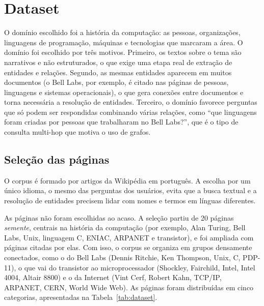 %

\section{Dataset}
\label{sec:dataset}

O domínio escolhido foi a história da computação: as pessoas, organizações, linguagens de programação, máquinas e tecnologias que marcaram a área. O domínio foi escolhido por três motivos. Primeiro, os textos sobre o tema são narrativos e não estruturados, o que exige uma etapa real de extração de entidades e relações. Segundo, as mesmas entidades aparecem em muitos documentos (o Bell Labs, por exemplo, é citado nas páginas de pessoas, linguagens e sistemas operacionais), o que gera conexões entre documentos e torna necessária a resolução de entidades. Terceiro, o domínio favorece perguntas que só podem ser respondidas combinando várias relações, como ``que linguagens foram criadas por pessoas que trabalharam no Bell Labs?'', que é o tipo de consulta multi-hop que motiva o uso de grafos.

\subsection{Seleção das páginas}

O corpus é formado por artigos da Wikipédia em português. A escolha por um único idioma, o mesmo das perguntas dos usuários, evita que a busca textual e a resolução de entidades precisem lidar com nomes e termos em línguas diferentes.

As páginas não foram escolhidas ao acaso. A seleção partiu de 20 páginas \emph{semente}, centrais na história da computação (por exemplo, Alan Turing, Bell Labs, Unix, linguagem C, ENIAC, ARPANET e transistor), e foi ampliada com páginas citadas por elas. Com isso, o corpus se organiza em grupos densamente conectados, como o do Bell Labs (Dennis Ritchie, Ken Thompson, Unix, C, PDP-11), o que vai do transistor ao microprocessador (Shockley, Fairchild, Intel, Intel 4004, Altair 8800) e o da Internet (Vint Cerf, Robert Kahn, TCP/IP, ARPANET, CERN, World Wide Web). As páginas foram distribuídas em cinco categorias, apresentadas na Tabela~\ref{tab:dataset}.

